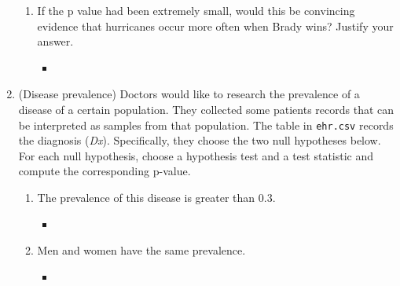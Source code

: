 \documentclass[12pt,twoside]{article}
\begin{document}
\begin{enumerate}
\begin{enumerate}
\item If the p value had been extremely small, would this be convincing evidence that hurricanes occur more often when Brady wins? Justify your answer.
\begin{itemize}
    \color{blue}
    \item 
\end{itemize}
\end{enumerate}
\newpage





\item (Disease prevalence)
Doctors would like to research the prevalence of a disease of a certain population. They collected some patients records that can be interpreted as samples from that population. The table in \texttt{ehr.csv} records the diagnosis (\textit{Dx}). Specifically, they choose the two null hypotheses below. For each null hypothesis, choose a hypothesis test and a test statistic and compute the corresponding p-value. 
\begin{enumerate}
\item The prevalence of this disease is greater than 0.3.
\begin{itemize}
    \color{blue}
    \item 
\end{itemize}


\item Men and women have the same prevalence.
\begin{itemize}
    \color{blue}
    \item 
\end{itemize}

\end{enumerate}

\end{enumerate}
\end{document}
